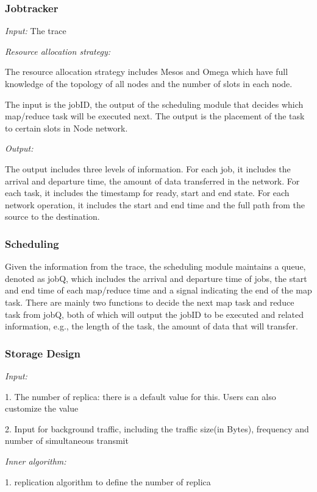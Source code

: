 \documentclass{Project}
\begin{document}
\subsubsection{Jobtracker}
\emph{Input: } The trace

\emph{Resource allocation strategy: } 

The resource allocation strategy includes Mesos and Omega which have full knowledge of the topology of all nodes and the number of slots in each node.

The input is the jobID, the output of the scheduling module that decides which map/reduce task will be executed next. The output is the placement of the task to certain slots in Node network.

\emph{Output:}

The output includes three levels of information. For each job, it includes the arrival and departure time, the amount of data transferred in the network. For each task, it includes the timestamp for ready, start and end state. For each network operation, it includes the start and end time and the full path from the source to the destination.

\subsubsection{Scheduling}
Given the information from the trace, the scheduling module maintains a queue, denoted as jobQ, which includes the arrival and departure time of jobs, the start and end time of each map/reduce time and a signal indicating the end of the map task. There are mainly two functions to decide the next map task and reduce task from jobQ, both of which will output the jobID to be executed and related information, e.g., the length of the task, the amount of data that will transfer.

\subsubsection{Storage Design}
\emph{Input:}

1. The number of replica: there is a default value for this. Users can also customize the value

2. Input for background traffic, including the traffic size(in Bytes), frequency and number of simultaneous transmit

\emph{Inner algorithm:}

1. replication algorithm to define the number of replica
\end{document}
